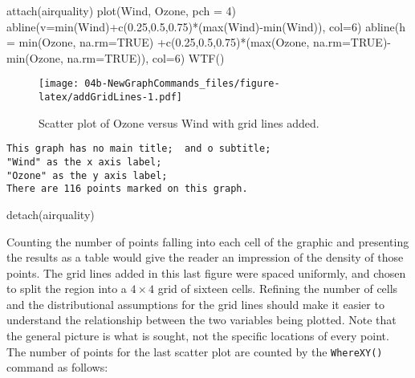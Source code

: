 \documentclass[
]{book}
\newenvironment{Shaded}{\begin{snugshade}}{\end{snugshade}}
\newcommand{\AttributeTok}[1]{\textcolor[rgb]{0.77,0.63,0.00}{#1}}
\newcommand{\ConstantTok}[1]{\textcolor[rgb]{0.00,0.00,0.00}{#1}}
\newcommand{\DecValTok}[1]{\textcolor[rgb]{0.00,0.00,0.81}{#1}}
\newcommand{\FloatTok}[1]{\textcolor[rgb]{0.00,0.00,0.81}{#1}}
\newcommand{\FunctionTok}[1]{\textcolor[rgb]{0.00,0.00,0.00}{#1}}
\newcommand{\NormalTok}[1]{#1}
\newcommand{\SpecialCharTok}[1]{\textcolor[rgb]{0.00,0.00,0.00}{#1}}
\begin{document}
\begin{Shaded}
\begin{Highlighting}[]
\FunctionTok{attach}\NormalTok{(airquality)}
\FunctionTok{plot}\NormalTok{(Wind, Ozone, }\AttributeTok{pch =} \DecValTok{4}\NormalTok{)}
\FunctionTok{abline}\NormalTok{(}\AttributeTok{v=}\FunctionTok{min}\NormalTok{(Wind)}\SpecialCharTok{+}\FunctionTok{c}\NormalTok{(}\FloatTok{0.25}\NormalTok{,}\FloatTok{0.5}\NormalTok{,}\FloatTok{0.75}\NormalTok{)}\SpecialCharTok{*}\NormalTok{(}\FunctionTok{max}\NormalTok{(Wind)}\SpecialCharTok{{-}}\FunctionTok{min}\NormalTok{(Wind)), }\AttributeTok{col=}\DecValTok{6}\NormalTok{)}
\FunctionTok{abline}\NormalTok{(}\AttributeTok{h =} \FunctionTok{min}\NormalTok{(Ozone, }\AttributeTok{na.rm=}\ConstantTok{TRUE}\NormalTok{) }\SpecialCharTok{+}\FunctionTok{c}\NormalTok{(}\FloatTok{0.25}\NormalTok{,}\FloatTok{0.5}\NormalTok{,}\FloatTok{0.75}\NormalTok{)}\SpecialCharTok{*}\NormalTok{(}\FunctionTok{max}\NormalTok{(Ozone, }\AttributeTok{na.rm=}\ConstantTok{TRUE}\NormalTok{)}\SpecialCharTok{{-}}\FunctionTok{min}\NormalTok{(Ozone, }\AttributeTok{na.rm=}\ConstantTok{TRUE}\NormalTok{)), }\AttributeTok{col=}\DecValTok{6}\NormalTok{)}
\FunctionTok{WTF}\NormalTok{()}
\end{Highlighting}
\end{Shaded}

\begin{figure}
\centering
\texttt{[image: 04b-NewGraphCommands\_files/figure-latex/addGridLines-1.pdf]}
\caption{\label{fig:addGridLines}Scatter plot of Ozone versus Wind with grid lines added.}
\end{figure}

\begin{verbatim}
This graph has no main title;  and o subtitle;
"Wind" as the x axis label;
"Ozone" as the y axis label;
There are 116 points marked on this graph.
\end{verbatim}

\begin{Shaded}
\begin{Highlighting}[]
\FunctionTok{detach}\NormalTok{(airquality)}
\end{Highlighting}
\end{Shaded}

Counting the number of points falling into each cell of the graphic and presenting the results as a table would give the reader an impression of the density of those points. The grid lines added in this last figure were spaced uniformly, and chosen to split the region into a \(4\times4\) grid of sixteen cells.
Refining the number of cells and the distributional assumptions for the grid lines should make it easier to understand the relationship between the two variables being plotted. Note that the general picture is what is sought, not the specific locations of every point. The number of points for the last scatter plot are counted by the \texttt{WhereXY()} command as follows:
\end{document}
